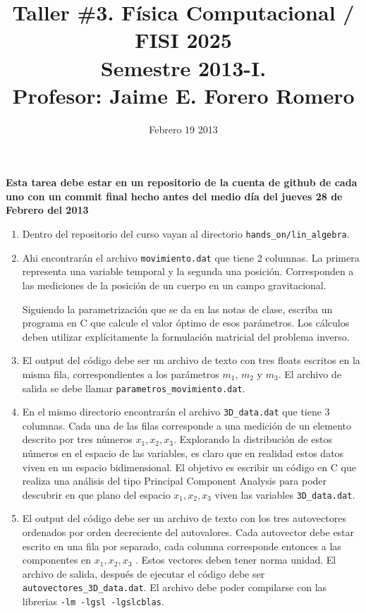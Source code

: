 \documentclass{article}
\title{Taller \#3. F\'isica Computacional / FISI 2025 \\Semestre 2013-I. \\ Profesor: Jaime E. Forero Romero}
\date{Febrero 19 2013}
\begin{document}
\maketitle

{\bf Esta tarea debe estar en un repositorio de la cuenta de github de
  cada uno con un commit final hecho antes del medio d\'ia del jueves
  28 de Febrero del 2013} 

\begin{enumerate}
\item
Dentro del repositorio del curso vayan al directorio
\verb"hands_on/lin_algebra". 

\item
Ahi encontrar\'an el archivo \verb"movimiento.dat" que tiene 2
columnas. La primera representa una variable temporal y la segunda una
posici\'on. Corresponden a las mediciones de la posici\'on de un
cuerpo en un campo gravitacional. 

Siguiendo la parametrizaci\'on que se da en las notas de clase,
escriba un programa en C que calcule el valor \'optimo de esos
par\'ametros. Los c\'alculos deben utilizar expl\'icitamente la
formulaci\'on matricial del problema inverso.

\item
El output del c\'odigo debe ser un archivo de texto con tres floats
escritos en la misma fila, correspondientes a los par\'ametros $m_1$,
$m_2$ y $m_3$. El archivo de salida se debe llamar \verb"parametros_movimiento.dat".  

\item

En el mismo directorio encontrar\'an el archivo \verb"3D_data.dat" que
tiene 3 columnas. Cada una de las filas
corresponde a una medici\'on de un elemento descrito por tres
n\'umeros $x_{1}, x_{2}, x_{3}$. Explorando la distribuci\'on de estos
n\'umeros en el espacio de las variables, es claro que en realidad
estos datos viven en un espacio bidimensional. El objetivo es escribir
un c\'odigo en C que realiza una an\'alisis del tipo Principal
Component Analysis para poder descubrir en que plano del espacio
$x_{1}, x_{2}, x_3$ viven las variables \verb"3D_data.dat". 

\item 
El output del c\'odigo debe ser un archivo de texto con los tres
autovectores ordenados por orden decreciente del autovalores. Cada
autovector debe estar escrito en una fila por separado, cada
columna corresponde entonces a las componentes en
$x_{1}, x_{2}, x_{3}$ . Estos vectores deben tener norma unidad. El archivo de
salida, despu\'es de ejecutar el c\'odigo debe ser
\verb"autovectores_3D_data.dat". El archivo debe poder compilarse con
las librerias \verb"-lm -lgsl -lgslcblas".


\end{enumerate}
\end{document}
